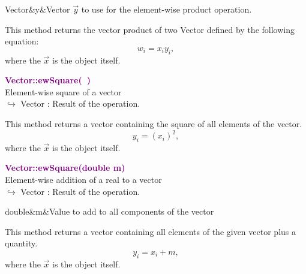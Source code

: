 \begin{tcolorbox}[width=\textwidth,myArgs,tabularx={ll|R}]
Vector&y&Vector $\overrightarrow{y}$ to use for the element-wise product operation.
\end{tcolorbox}

This method returns the vector product of two Vector defined by the following equation:
\begin{equation*}
w_i = x_i y_i,
\end{equation*}
where the $\overrightarrow{x}$ is the object itself.

\textcolor{purple}{\textbf{Vector::ewSquare(~)}}\label{Vector::ewSquare()}\\
Element-wise square of a vector\\ \hspace*{10mm}$\hookrightarrow$ Vector : Result of the operation.

This method returns a vector containing the square of all elements of the vector.
\begin{equation*}
y_i = (x_i)^2,
\end{equation*}
where the $\overrightarrow{x}$ is the object itself.

\textcolor{purple}{\textbf{Vector::ewSquare(double m)}}\label{Vector::ewSquare(double m)}\\
Element-wise addition of a real to a vector\\ \hspace*{10mm}$\hookrightarrow$ Vector : Result of the operation.

\begin{tcolorbox}[width=\textwidth,myArgs,tabularx={ll|R}]
double&m&Value to add to all components of the vector
\end{tcolorbox}

This method returns a vector containing all elements of the given vector plus a quantity.
\begin{equation*}
y_i = x_i + m,
\end{equation*}
where the $\overrightarrow{x}$ is the object itself.

